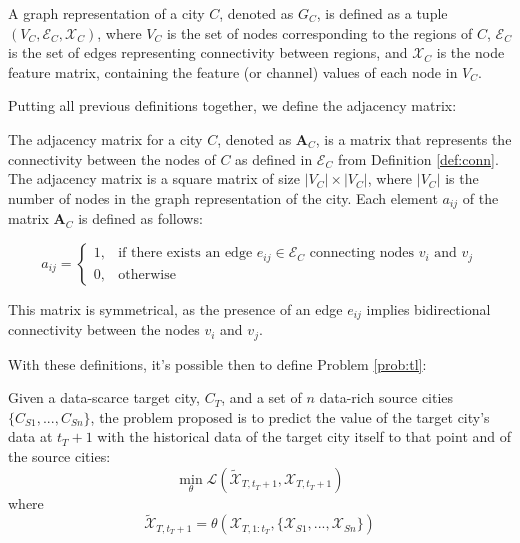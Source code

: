 \begin{definition}\label{def:graph}
A graph representation of a city \( C \), denoted as \( G_C \), is defined as a tuple \( (V_C, \mathcal{E}_C,\mathcal{X}_C) \), where \( V_C \) is the set of nodes corresponding to the regions of \( C \), \( \mathcal{E}_C \) is the set of edges representing connectivity between regions, and \(\mathcal{X}_C \) is the node feature matrix, containing the feature (or channel) values of each node in \( V_C \). 
\end{definition}

Putting all previous definitions together, we define the adjacency matrix:

\begin{definition}\label{def:adj_matrix}
The adjacency matrix for a city \( C \), denoted as \( \mathbf{A}_C \), is a matrix that represents the connectivity between the nodes of \( C \) as defined in \( \mathcal{E}_C \) from Definition \ref{def:conn}. The adjacency matrix is a square matrix of size \( |V_C| \times |V_C| \), where \( |V_C| \) is the number of nodes in the graph representation of the city. Each element \( a_{ij} \) of the matrix \( \mathbf{A}_C \) is defined as follows:

$$
a_{ij} = 
\begin{cases}
1, & \text{if there exists an edge } e_{ij} \in \mathcal{E}_C \text{ connecting nodes } v_i \text{ and } v_j \\
0, & \text{otherwise}
\end{cases}
$$

This matrix is symmetrical, as the presence of an edge \( e_{ij} \) implies bidirectional connectivity between the nodes \( v_i \) and \( v_j \).
\end{definition}



With these definitions, it's possible then to define Problem \ref{prob:tl}:

\begin{problem} \label{prob:tl}
Given a data-scarce target city, $C_T$, and a set of $n$ data-rich source cities $\{C_{S1}, ..., C_{Sn}\}$, the problem proposed is to predict the value of the target city's data at $t_T+1$ with the historical data of the target city itself to that point and of the source cities:
	\begin{equation}\label{eq:probtl}
		\min_{\theta}\mathcal{L}(\tilde{\mathcal{X}}_{T, t_T + 1}, \mathcal{X}_{T, t_T + 1} )
	\end{equation}
	where
	\begin{equation}\label{eq:probtl2}
		\tilde{\mathcal{X}}_{T, t_T + 1} =  \theta(\mathcal{X}_{T, 1:t_T}, \{\mathcal{X}_{S1}, ..., \mathcal{X}_{Sn}\})
	\end{equation}
\end{problem}

